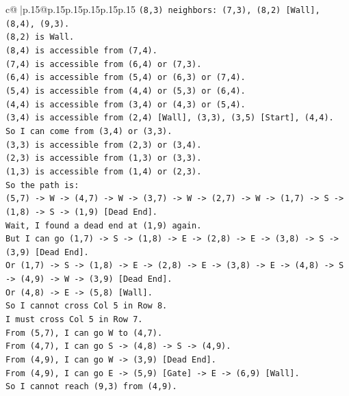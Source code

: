 \documentclass{article}
\begin{document}
{\begin{supertabular}{c@{$\;$}|p{.15\linewidth}@{}p{.15\linewidth}p{.15\linewidth}p{.15\linewidth}p{.15\linewidth}p{.15\linewidth}}
{{{\texttt{(8,3) neighbors: (7,3), (8,2) {[}Wall{]}, (8,4), (9,3).} \\
\texttt{(8,2) is Wall.} \\
\texttt{(8,4) is accessible from (7,4).} \\
\texttt{(7,4) is accessible from (6,4) or (7,3).} \\
\texttt{(6,4) is accessible from (5,4) or (6,3) or (7,4).} \\
\texttt{(5,4) is accessible from (4,4) or (5,3) or (6,4).} \\
\texttt{(4,4) is accessible from (3,4) or (4,3) or (5,4).} \\
\texttt{(3,4) is accessible from (2,4) {[}Wall{]}, (3,3), (3,5) {[}Start{]}, (4,4).} \\
\texttt{So I can come from (3,4) or (3,3).} \\
\texttt{(3,3) is accessible from (2,3) or (3,4).} \\
\texttt{(2,3) is accessible from (1,3) or (3,3).} \\
\texttt{(1,3) is accessible from (1,4) or (2,3).} \\
\texttt{So the path is:} \\
\texttt{(5,7) {-}> W {-}> (4,7) {-}> W {-}> (3,7) {-}> W {-}> (2,7) {-}> W {-}> (1,7) {-}> S {-}> (1,8) {-}> S {-}> (1,9) {[}Dead End{]}.} \\
\texttt{Wait, I found a dead end at (1,9) again.} \\
\texttt{But I can go (1,7) {-}> S {-}> (1,8) {-}> E {-}> (2,8) {-}> E {-}> (3,8) {-}> S {-}> (3,9) {[}Dead End{]}.} \\
\texttt{Or (1,7) {-}> S {-}> (1,8) {-}> E {-}> (2,8) {-}> E {-}> (3,8) {-}> E {-}> (4,8) {-}> S {-}> (4,9) {-}> W {-}> (3,9) {[}Dead End{]}.} \\
\texttt{Or (4,8) {-}> E {-}> (5,8) {[}Wall{]}.} \\
\texttt{So I cannot cross Col 5 in Row 8.} \\
\texttt{I must cross Col 5 in Row 7.} \\
\texttt{From (5,7), I can go W to (4,7).} \\
\texttt{From (4,7), I can go S {-}> (4,8) {-}> S {-}> (4,9).} \\
\texttt{From (4,9), I can go W {-}> (3,9) {[}Dead End{]}.} \\
\texttt{From (4,9), I can go E {-}> (5,9) {[}Gate{]} {-}> E {-}> (6,9) {[}Wall{]}.} \\
\texttt{So I cannot reach (9,3) from (4,9).} \\
}}}
\end{supertabular}}
\end{document}
